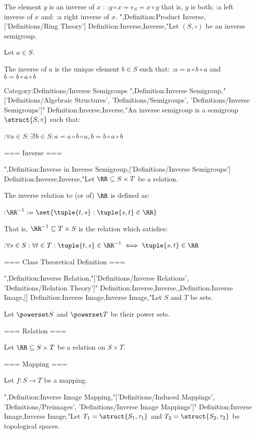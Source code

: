 The element $y$ is an inverse of $x$ :
:$y \circ x = e_S = x \circ y$
that is,  $y$ is both:
:a left inverse of $x$
and:
:a right inverse of $x$.
",Definition:Product Inverse,['Definitions/Ring Theory']
Definition:Inverse,Inverse,"Let $(S, \circ)$ be an inverse semigroup.

Let $a\in S$.


The inverse of $a$ is the unique element $b\in S$ such that:
:$a = a \circ b \circ a$ and $b = b \circ a \circ b$


Category:Definitions/Inverse Semigroups
",Definition:Inverse Semigroup,"['Definitions/Algebraic Structures', 'Definitions/Semigroups', 'Definitions/Inverse Semigroups']"
Definition:Inverse,Inverse,"An inverse semigroup is a semigroup $\struct {S, \circ}$ such that:

:$\forall a \in S: \exists! b \in S: a = a \circ b \circ a, b = b \circ a \circ b$


=== Inverse ===

",Definition:Inverse in Inverse Semigroup,['Definitions/Inverse Semigroups']
Definition:Inverse,Inverse,"Let $\RR \subseteq S \times T$ be a relation.


The inverse relation to (or of) $\RR$ is defined as:

:$\RR^{-1} := \set {\tuple {t, s}: \tuple {s, t} \in \RR}$


That is, $\RR^{-1} \subseteq T \times S$ is the relation which satisfies:

:$\forall s \in S: \forall t \in T: \tuple {t, s} \in \RR^{-1} \iff \tuple {s, t} \in \RR$


=== Class Theoretical Definition ===


",Definition:Inverse Relation,"['Definitions/Inverse Relations', 'Definitions/Relation Theory']"
Definition:Inverse,Inverse,,Definition:Inverse Image,[]
Definition:Inverse Image,Inverse Image,"Let $S$ and $T$ be sets.

Let $\powerset S$ and $\powerset T$ be their power sets.


=== Relation ===

Let $\RR \subseteq S \times T$ be a relation on $S \times T$.



=== Mapping ===

Let $f: S \to T$ be a mapping.

",Definition:Inverse Image Mapping,"['Definitions/Induced Mappings', 'Definitions/Preimages', 'Definitions/Inverse Image Mappings']"
Definition:Inverse Image,Inverse Image,"Let $T_1 = \struct {S_1, \tau_1}$ and $T_2 = \struct {S_2, \tau_2}$ be topological spaces.

